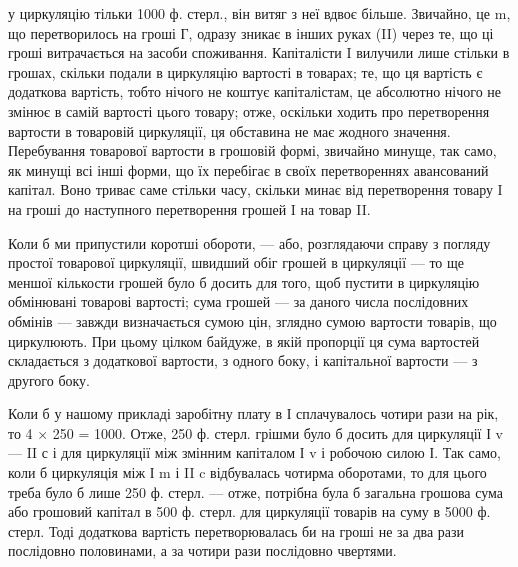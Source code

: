 \parcont{}  %
у циркуляцію тільки 1000 ф. стерл., він витяг з неї вдвоє більше. Звичайно,
це m, що перетворилось на гроші Г, одразу зникає в інших руках
(II) через те, що ці гроші витрачається на засоби споживання. Капіталісти I
вилучили лише стільки в грошах, скільки подали в циркуляцію вартості
в товарах; те, що ця вартість є додаткова вартість, тобто нічого не коштує
капіталістам, це абсолютно нічого не змінює в самій вартості цього товару;
отже, оскільки ходить про перетворення вартости в товаровій циркуляції,
ця обставина не має жодного значення. Перебування товарової вартости
в грошовій формі, звичайно минуще, так само, як минущі всі інші форми,
що їх перебігає в своїх перетвореннях авансований капітал. Воно триває
саме стільки часу, скільки минає від перетворення товару I на гроші до
наступного перетворення грошей I на товар II.

Коли б ми припустили коротші обороти, — або, розглядаючи справу
з погляду простої товарової циркуляції, швидший обіг грошей в циркуляції
— то ще меншої кількости грошей було б досить для того, щоб
пустити в циркуляцію обмінювані товарові вартості; сума грошей — за
даного числа послідовних обмінів — завжди визначається сумою цін, зглядно
сумою вартости товарів, що циркулюють. При цьому цілком байдуже,
в якій пропорції ця сума вартостей складається з додаткової вартости,
з одного боку, і капітальної вартости — з другого боку.

Коли б у нашому прикладі заробітну плату в І сплачувалось чотири
рази на рік, то 4 × 250 = 1000. Отже, 250 ф. стерл. грішми було б
досить для циркуляції І v —  II с і для циркуляції між змінним капіталом
І v і робочою силою І. Так само, коли б циркуляція між І m і
II c відбувалась чотирма оборотами, то для цього треба було б лише
250 ф. стерл. — отже, потрібна була б загальна грошова сума або грошовий
капітал в 500 ф. стерл. для циркуляції товарів на суму в 5000 ф. стерл.
Тоді додаткова вартість перетворювалась би на гроші не за два рази
послідовно половинами, а за чотири рази послідовно чвертями.

